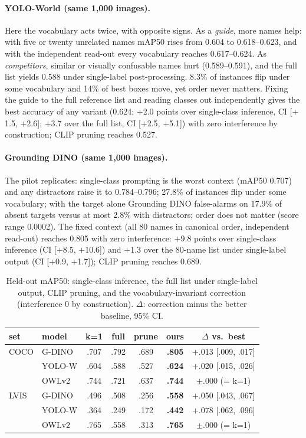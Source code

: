 \documentclass[10pt,twocolumn,letterpaper]{article}
\begin{document}
\paragraph{YOLO-World (same 1{,}000 images).} Here the vocabulary acts twice, with opposite signs. As a \emph{guide},
more names help: with five or twenty unrelated names mAP50 rises from 0.604 to 0.618--0.623, and with the independent
read-out every vocabulary reaches 0.617--0.624. As \emph{competitors}, similar or visually confusable names hurt
(0.589--0.591), and the full list yields 0.588 under single-label post-processing. 8.3\% of instances flip under some
vocabulary and 14\% of best boxes move, yet order never matters. Fixing the guide to the full reference list and
reading classes out independently gives the best accuracy of any variant (0.624; $+$2.0 points over single-class
inference, CI [$+$1.5, $+$2.6]; $+$3.7 over the full list, CI [$+$2.5, $+$5.1]) with zero interference by
construction; CLIP pruning reaches 0.527.

\paragraph{Grounding DINO (same 1{,}000 images).} The pilot replicates: single-class prompting is the worst context
(mAP50 0.707) and any distractors raise it to 0.784--0.796; 27.8\% of instances flip under some vocabulary; with the
target alone Grounding DINO false-alarms on 17.9\% of absent targets versus at most 2.8\% with distractors; order does
not matter (score range 0.0002). The fixed context (all 80 names in canonical order, independent read-out) reaches
0.805 with zero interference: $+$9.8 points over single-class inference (CI [$+$8.5, $+$10.6]) and $+$1.3 over the 80-name
list under single-label output (CI [$+$0.9, $+$1.7]); CLIP pruning reaches 0.689.

\begin{table}[t]\centering\small\setlength{\tabcolsep}{2.5pt}
\caption{Held-out mAP50: single-class inference, the full list under single-label output, CLIP pruning, and the
vocabulary-invariant correction (interference 0 by construction). $\Delta$: correction minus the better baseline, 95\% CI.}\label{tab:main}
\begin{tabular}{llccccc}\toprule
set & model & k=1 & full & prune & ours & $\Delta$ vs.\ best\\\midrule
COCO & G-DINO & .707 & .792 & .689 & \textbf{.805} & $+$.013 [.009, .017]\\
 & YOLO-W & .604 & .588 & .527 & \textbf{.624} & $+$.020 [.015, .026]\\
 & OWLv2 & .744 & .721 & .637 & \textbf{.744} & $\pm$.000 (= k=1)\\
LVIS & G-DINO & .496 & .508 & .256 & \textbf{.558} & $+$.050 [.043, .067]\\
 & YOLO-W & .364 & .249 & .172 & \textbf{.442} & $+$.078 [.062, .096]\\
 & OWLv2 & .765 & .558 & .313 & \textbf{.765} & $\pm$.000 (= k=1)\\\bottomrule
\end{tabular}\end{table}
\end{document}
